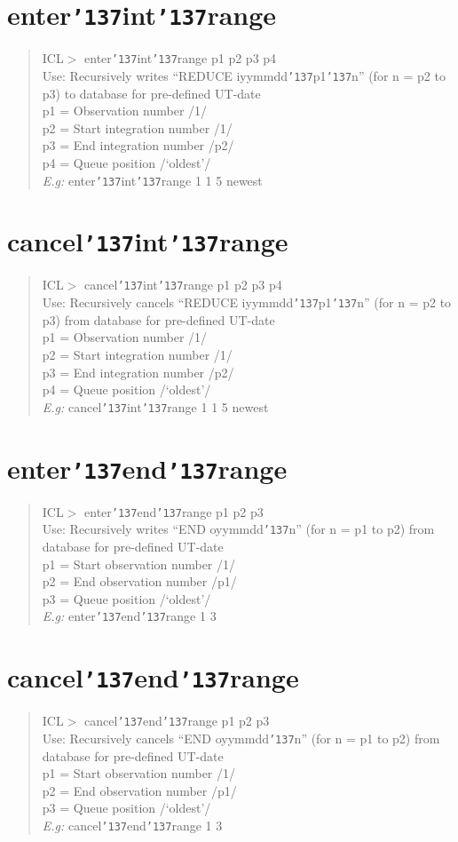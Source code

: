 \documentclass[a4paper]{book}
\renewcommand{\_}{{\tt\char'137}}
\begin{document}
\section{enter\_int\_range}
\begin{quote}
ICL$>$ enter\_int\_range p1 p2 p3 p4 \\
Use: Recursively writes ``REDUCE iyymmdd\_p1\_n''
(for n = p2 to p3) to database for pre-defined UT-date \\
p1 = Observation number /1/ \\
p2 = Start integration number /1/ \\
p3 = End integration number /p2/ \\
p4 = Queue position /`oldest'/ \\
{\em E.g:} enter\_int\_range 1 1 5 newest
\end{quote}
\section{cancel\_int\_range}
\begin{quote}
ICL$>$ cancel\_int\_range p1 p2 p3 p4 \\
Use: Recursively cancels ``REDUCE iyymmdd\_p1\_n''
(for n = p2 to p3) from database for pre-defined UT-date \\
p1 = Observation number /1/ \\
p2 = Start integration number /1/ \\
p3 = End integration number /p2/ \\
p4 = Queue position /`oldest'/ \\
{\em E.g:} cancel\_int\_range 1 1 5 newest
\end{quote}
\section{enter\_end\_range}
\begin{quote}
ICL$>$ enter\_end\_range p1 p2 p3 \\
Use: Recursively writes ``END oyymmdd\_n'' (for n = p1 to p2)
 from database for pre-defined UT-date \\
p1 = Start observation number /1/ \\
p2 = End observation number /p1/ \\
p3 = Queue position /`oldest'/ \\
{\em E.g:} enter\_end\_range 1 3
\end{quote}
\section{cancel\_end\_range}
\begin{quote}
ICL$>$ cancel\_end\_range p1 p2 p3 \\
Use: Recursively cancels ``END oyymmdd\_n'' (for n = p1 to p2)
 from database for pre-defined UT-date \\
p1 = Start observation number /1/ \\
p2 = End observation number /p1/ \\
p3 = Queue position /`oldest'/ \\
{\em E.g:} cancel\_end\_range 1 3
\end{quote}
\end{document}
